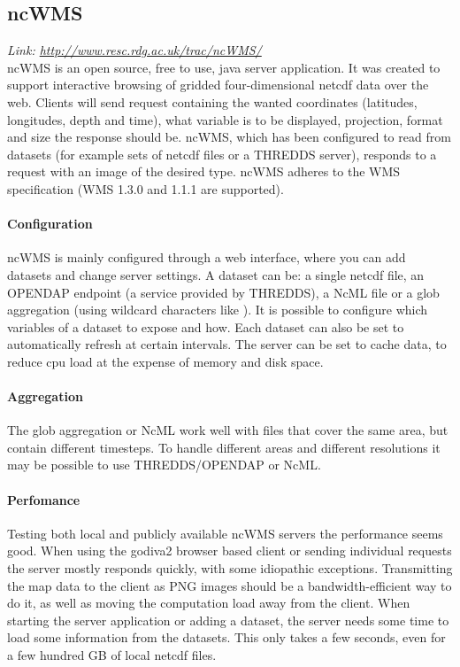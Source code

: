\documentclass[11pt,a4paper,titlepage,oneside]{report}
\begin{document}
    \subsection{ncWMS}
  \emph{Link: \url{http://www.resc.rdg.ac.uk/trac/ncWMS/}} \\%
    ncWMS is an open source, free to use, java server application. It was created to support interactive browsing of gridded four-dimensional \gls{netcdf} data over the web. Clients will send request containing the wanted coordinates (latitudes, longitudes, depth and time), what variable is to be displayed, projection, format and size the response should be. ncWMS, which has been configured to read from datasets (for example sets of \gls{netcdf} files or a \gls{THREDDS} server), responds to a request with an image of the desired type. ncWMS adheres to the \gls{WMS} specification (\gls{WMS} 1.3.0 and 1.1.1 are supported).
    \paragraph{Configuration}
    ncWMS is mainly configured through a web interface, where you can add datasets and change server settings. A dataset can be: a single \gls{netcdf} file, an \gls{OPENDAP} endpoint (a service provided by \gls{THREDDS}), a NcML file or a glob aggregation (using wildcard characters like ). It is possible to configure which variables of a dataset to expose and how. Each dataset can also be set to automatically refresh at certain intervals. The server can be set to cache data, to reduce cpu load at the expense of memory and disk space.
    \paragraph{Aggregation}
    The glob aggregation or NcML work well with files that cover the same area, but contain different timesteps. To handle different areas and different resolutions it may be possible to use \gls{THREDDS}/\gls{OPENDAP} or NcML.
    \paragraph{Perfomance}
    Testing both local and publicly available ncWMS servers the performance seems good. When using the godiva2 browser based client or sending individual requests the server mostly responds quickly, with some idiopathic exceptions. Transmitting the map data to the client as \gls{PNG} images should be a bandwidth-efficient way to do it, as well as moving the computation load away from the client. When starting the server application or adding a dataset, the server needs some time to load some information from the datasets. This only takes a few seconds, even for a few hundred GB of local \gls{netcdf} files.
\end{document}
